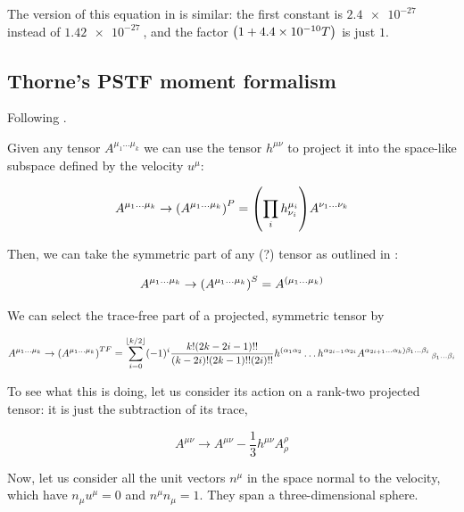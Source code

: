 \documentclass[main.tex]{subfiles}
\begin{document}
The version of this equation in \textcite[equation 10]{StellingwerfBuff:1982} is similar: the first constant is \(\SI{2.4e-27}{} \) instead of \(\SI{1.42e-27}{} \), and the factor \(\qty(1 + \SI{4.4e-10}{}T)\) is just \(1\).

\subsection{Thorne's PSTF moment formalism}

Following \cite{Thorne:1981feb}.

Given any tensor \(A^{\mu_1 \dots \mu_k}\) we can use the tensor \(h^{\mu\nu}\) to project it into the space-like subspace defined by the velocity \(u^\mu\):

\begin{equation}
    A^{\mu_1 \dots \mu_k} \rightarrow \qty(A^{\mu_1 \dots \mu_k})^P
    = \qty(\prod_i h^{\mu_i}_{\nu_i}) A^{\nu_1 \dots \nu_k}
\end{equation}

Then, we can take the symmetric part of any (?) tensor as outlined in :

\begin{equation}
    A^{\mu_1 \dots \mu_k} \rightarrow \qty(A^{\mu_1 \dots \mu_k})^S
    = A^{(\mu_1 \dots \mu_k)}
\end{equation}

We can select the trace-free part of a projected, symmetric tensor by

\begin{equation}
    A^{\mu_1 \dots \mu_k} \rightarrow \qty(A^{\mu_1 \dots \mu_k})^{TF}
    = \sum _{i=0}   ^{\lfloor k/2 \rfloor}
    (-1)^i \frac{k! (2k-2i-1)!!}{(k-2i)! (2k-1)!! (2i)!!}
    h^{(\alpha_1 \alpha_2} \dots h^{\alpha_{2i-1} \alpha_{2i}}
    A^{\alpha_{2i+1} \dots \alpha_k) \beta_1 \dots \beta_i}\,_{\beta_1 \dots \beta_i}
\end{equation}

To see what this is doing, let us consider its action on a rank-two projected tensor: it is just the subtraction of its trace,

\begin{equation}
    A^{\mu\nu} \rightarrow A^{\mu\nu} - \frac{1}{3} h^{\mu\nu} A^{\rho}_\rho
\end{equation}

Now, let us consider all the unit vectors \(n^\mu\) in the space normal to the velocity, which have \(n_\mu u^\mu = 0\) and \(n^\mu n_\mu = 1\). They span a three-dimensional sphere.
\end{document}
